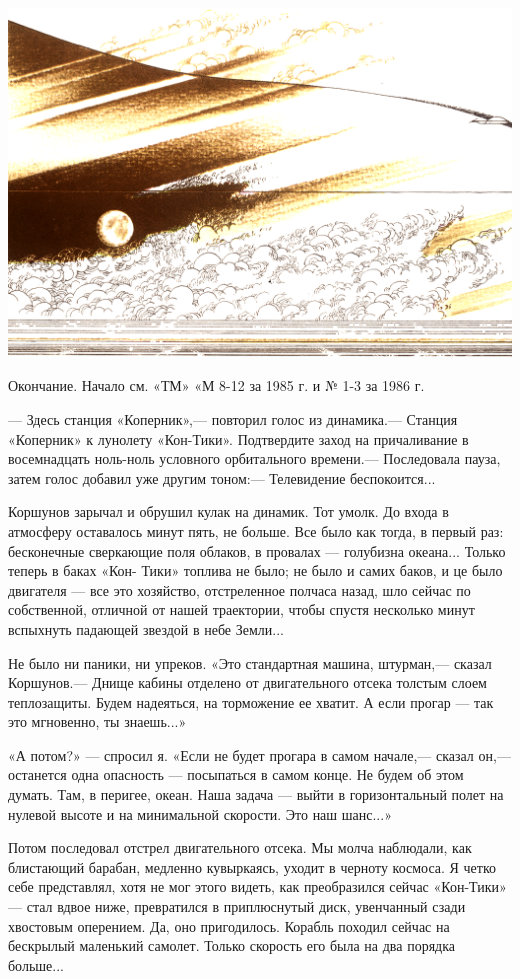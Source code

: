 \documentclass[11pt,a4paper,oneside]{article}
\begin{document}
\includegraphics[width=\textwidth]{sos1}

Окончание. Начало см. «ТМ» «М 8-12 за 1985 г. и № 1-3 за 1986 г.

— Здесь станция «Коперник»,— повторил голос из динамика.— Станция «Коперник» к лунолету «Кон-Тики». Подтвердите заход на причаливание в восемнадцать ноль-ноль условного орбитального времени.— Последовала пауза, затем голос добавил уже другим тоном:— Телевидение беспокоится...

Коршунов зарычал и обрушил кулак на динамик. Тот умолк. До входа в атмосферу оставалось минут пять, не больше. Все было как тогда, в первый раз: бесконечные сверкающие поля облаков, в провалах — голубизна океана... Только теперь в баках «Кон- Тики» топлива не было; не было и самих баков, и це было двигателя — все это хозяйство, отстреленное полчаса назад, шло сейчас по собственной, отличной от нашей траектории, чтобы спустя несколько минут вспыхнуть падающей звездой в небе Земли...

Не было ни паники, ни упреков. «Это стандартная машина, штурман,— сказал Коршунов.— Днище кабины отделено от двигательного отсека толстым слоем теплозащиты. Будем надеяться, на торможение ее хватит. А если прогар — так это мгновенно, ты знаешь...»

«А потом?» — спросил я. «Если не будет прогара в самом начале,— сказал он,— останется одна опасность — посыпаться в самом конце. Не будем об этом думать. Там, в перигее, океан. Наша задача — выйти в горизонтальный полет на нулевой высоте и на минимальной скорости. Это наш шанс...»

Потом последовал отстрел двигательного отсека. Мы молча наблюдали, как блистающий барабан, медленно кувыркаясь, уходит в черноту космоса. Я четко себе представлял, хотя не мог этого видеть, как преобразился сейчас «Кон-Тики» — стал вдвое ниже, превратился в приплюснутый диск, увенчанный сзади хвостовым оперением. Да, оно пригодилось. Корабль походил сейчас на бескрылый маленький самолет. Только скорость его была на два порядка больше...
\end{document}
